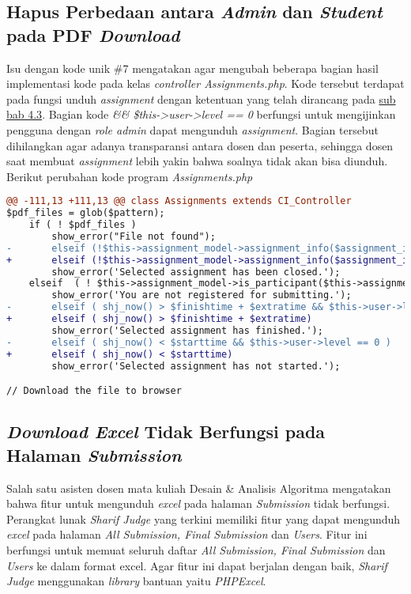 	\subsection{Hapus Perbedaan antara \textit{Admin} dan \textit{Student} pada PDF \textit{Download}}
	Isu dengan kode unik \#7 mengatakan agar mengubah beberapa bagian hasil implementasi kode pada kelas \textit{controller Assignments.php}. Kode tersebut terdapat pada fungsi unduh \textit{assignment} dengan ketentuan yang telah dirancang pada \hyperref[chap:batassoal]{sub bab 4.3}. Bagian kode \textit{\&\& \$this->user->level == 0} berfungsi untuk mengijinkan pengguna dengan \textit{role admin} dapat mengunduh \textit{assignment}. Bagian tersebut dihilangkan agar adanya transparansi antara dosen dan peserta, sehingga dosen saat membuat \textit{assignment} lebih yakin bahwa soalnya tidak akan bisa diunduh. Berikut perubahan kode program
	\textit{Assignments.php}
\begin{lstlisting}[language=diff, basicstyle=\ttfamily, frame=single,
columns=fullflexible, keepspaces=true, breaklines=true]
@@ -111,13 +111,13 @@ class Assignments extends CI_Controller
$pdf_files = glob($pattern);
	if ( ! $pdf_files )
		show_error("File not found");
-   	elseif (!$this->assignment_model->assignment_info($assignment_id)['open'] && $this->user->level == 0 )
+   	elseif (!$this->assignment_model->assignment_info($assignment_id)['open'])
		show_error('Selected assignment has been closed.');
	elseif  ( ! $this->assignment_model->is_participant($this->assignment_model->assignment_info($assignment_id)['participants'],$this->user->username) )
		show_error('You are not registered for submitting.');
-   	elseif ( shj_now() > $finishtime + $extratime && $this->user->level == 0 )
+   	elseif ( shj_now() > $finishtime + $extratime)
		show_error('Selected assignment has finished.');
-   	elseif ( shj_now() < $starttime && $this->user->level == 0 )
+   	elseif ( shj_now() < $starttime)
		show_error('Selected assignment has not started.');

// Download the file to browser
\end{lstlisting}

	\subsection{\textit{Download Excel} Tidak Berfungsi pada Halaman \textit{Submission}}
	Salah satu asisten dosen mata kuliah Desain \& Analisis Algoritma mengatakan bahwa fitur untuk mengunduh \textit{excel} pada halaman \textit{Submission} tidak berfungsi. Perangkat lunak \textit{Sharif Judge} yang terkini memiliki fitur yang dapat mengunduh \textit{excel} pada halaman \textit{All Submission, Final Submission} dan \textit{Users}. Fitur ini berfungsi untuk memuat seluruh daftar \textit{All Submission, Final Submission} dan \textit{Users} ke dalam format excel. Agar fitur ini dapat berjalan dengan baik, \textit{Sharif Judge} menggunakan \textit{library} bantuan yaitu \textit{PHPExcel}.
	
